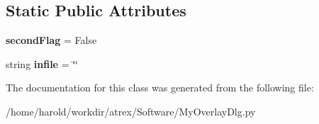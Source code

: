 \subsection*{Static Public Attributes}
\begin{DoxyCompactItemize}
\item 
\hypertarget{classMyOverlayDlg_1_1MyOverlayDlg_a90f6e4408789fb09a8373122658e9dda}{{\bfseries second\-Flag} = False}\label{classMyOverlayDlg_1_1MyOverlayDlg_a90f6e4408789fb09a8373122658e9dda}

\item 
\hypertarget{classMyOverlayDlg_1_1MyOverlayDlg_a9a655828844f2260620132477ff6e2ac}{string {\bfseries infile} = \char`\"{}\char`\"{}}\label{classMyOverlayDlg_1_1MyOverlayDlg_a9a655828844f2260620132477ff6e2ac}

\end{DoxyCompactItemize}


The documentation for this class was generated from the following file\-:\begin{DoxyCompactItemize}
\item 
/home/harold/workdir/atrex/\-Software/My\-Overlay\-Dlg.\-py\end{DoxyCompactItemize}

